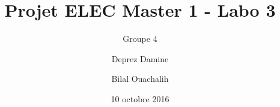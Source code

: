 \documentclass[frenchb, oneside, headings=normal]{scrartcl}
\begin{document}
\title{Projet ELEC Master 1 - Labo 3}
\subtitle{Groupe 4}
\author{Deprez Damine \and Bilal Ouachalih }
\date{10 octobre 2016}
\maketitle
\end{document}
